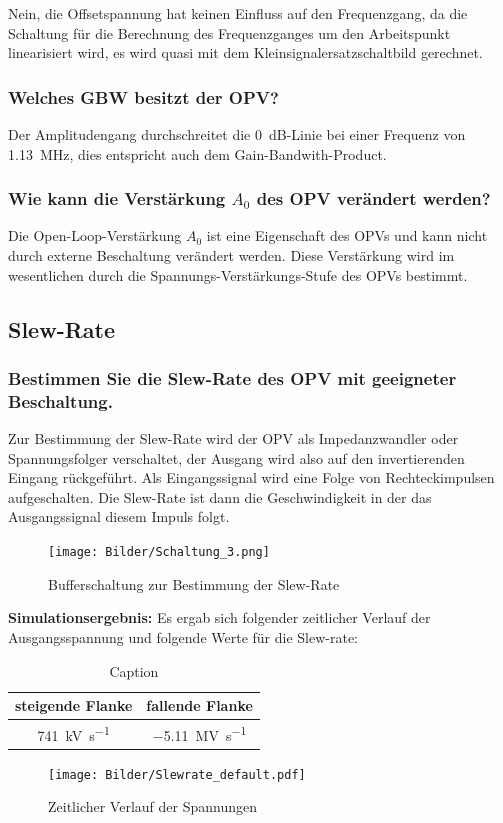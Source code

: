 Nein, die Offsetspannung hat keinen Einfluss auf den Frequenzgang, da die Schaltung für die Berechnung des Frequenzganges um den Arbeitspunkt linearisiert wird, es wird quasi mit dem Kleinsignalersatzschaltbild gerechnet.

\subsubsection{Welches GBW besitzt der OPV?}

Der Amplitudengang durchschreitet die \SI{0}{dB}-Linie bei einer Frequenz von \SI{1.13}{\mega \hertz}, dies entspricht auch dem Gain-Bandwith-Product.

\subsubsection{Wie kann die Verstärkung $A_0$ des OPV verändert werden?}

Die Open-Loop-Verstärkung $A_0$ ist eine Eigenschaft des OPVs und kann nicht durch externe Beschaltung verändert werden. Diese Verstärkung wird im wesentlichen durch die Spannungs-Verstärkungs-Stufe des OPVs bestimmt.

\subsection{Slew-Rate}

\subsubsection{Bestimmen Sie die Slew-Rate des OPV mit geeigneter Beschaltung.}

Zur Bestimmung der Slew-Rate wird der OPV als Impedanzwandler oder Spannungsfolger verschaltet, der Ausgang wird also auf den invertierenden Eingang rückgeführt. Als Eingangssignal wird eine Folge von Rechteckimpulsen aufgeschalten. Die Slew-Rate ist dann die Geschwindigkeit in der das Ausgangssignal diesem Impuls folgt.

\begin{figure}[H]
    \centering
    \texttt{[image: Bilder/Schaltung\_3.png]}
    \caption{Bufferschaltung zur Bestimmung der Slew-Rate}
    \label{fig:my_label}
\end{figure}

\textbf{Simulationsergebnis:} Es ergab sich folgender zeitlicher Verlauf der Ausgangsspannung und folgende Werte für die Slew-rate:

\begin{table}[H]
    \centering
    \begin{tabular}{|c|c|}
    \hline
         steigende Flanke & fallende Flanke  \\ \hline
         \SI{741}{\kilo \volt \per \second} & \SI{-5.11}{\mega \volt \per \second} \\ \hline
    \end{tabular}
    \caption{Caption}
    \label{tab:my_label}
\end{table}
\begin{figure}[H]
    \centering
    \texttt{[image: Bilder/Slewrate\_default.pdf]}
    \caption{Zeitlicher Verlauf der Spannungen}
\end{figure}

